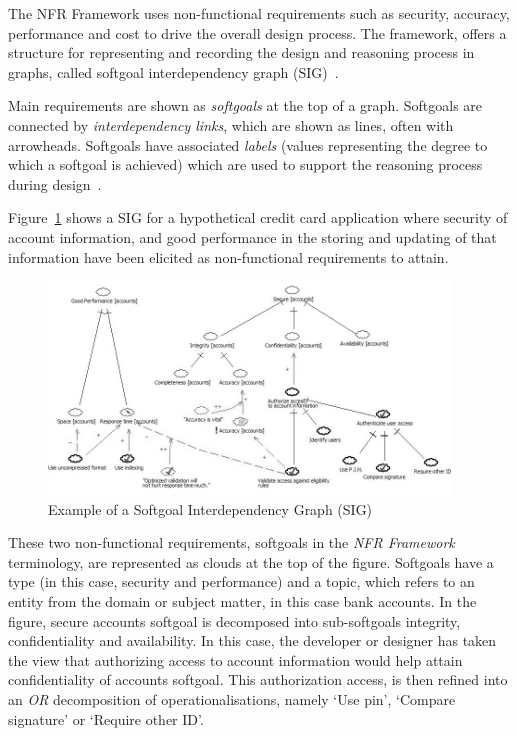 \documentclass[dissertation,final]{softeng}
\begin{document}
{The NFR Framework uses non-functional requirements such as security, accuracy, performance and cost to drive the overall design process. The framework, offers a structure for representing and recording the design and reasoning process in graphs, called softgoal interdependency graph (SIG)~\citep{Chung2000}. 

Main requirements are shown as \emph{softgoals} at the top of a graph. Softgoals are connected by \emph{interdependency links}, which are shown as lines, often with arrowheads. Softgoals have associated \emph{labels} (values representing the degree to which a softgoal is achieved) which are used to support the reasoning process during design~\citep{Chung2000}. 

Figure~\ref{fig:account_nfrs} shows a SIG for a hypothetical credit card application where security of account information, and good performance in the storing and updating of that information have been elicited as non-functional requirements to attain.

\begin{figure}[h]
\includegraphics[width=0.95\textwidth]{AccountNFRs2}
\centering
\caption[Example of a Softgoal Interdependency Graph]{Example of a Softgoal Interdependency Graph (SIG)~\footnotemark}
\label{fig:account_nfrs}
\end{figure}

These two non-functional requirements, softgoals in the \emph{NFR Framework} terminology, are represented as clouds at the top of the figure. Softgoals have a type (in this case, security and performance) and a topic, which refers to an entity from the domain or subject matter, in this case bank accounts. In the figure, secure accounts softgoal is decomposed into sub-softgoals integrity, confidentiality and availability. In this case, the developer or designer has taken the view that authorizing access to account information would help attain confidentiality of accounts softgoal. This authorization access, is then refined into an \emph{OR} decomposition of operationalisations, namely `Use pin', `Compare signature' or `Require other ID'.

}
\end{document}
